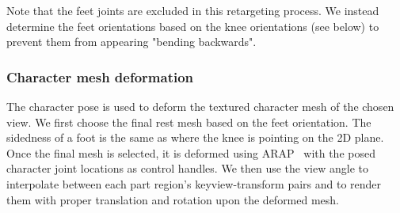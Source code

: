 Note that the feet joints are excluded in this retargeting process. We instead determine the feet orientations based on the knee orientations (see below) to prevent them from appearing "bending backwards".




\subsubsection{Character mesh deformation}
\label{sec:retarget-mesh}
The character pose is used to deform the textured character mesh of the chosen view. We first choose the final rest mesh based on the feet orientation. The sidedness of a foot is the same as where the knee is pointing on the 2D plane. Once the final mesh is selected, it is deformed using ARAP~\cite{igarashi2005asrigidaspossible} with the posed character joint locations as control handles. 
We then use the view angle to interpolate between each part region's keyview-transform pairs and to render them with proper translation and rotation upon the deformed mesh.


